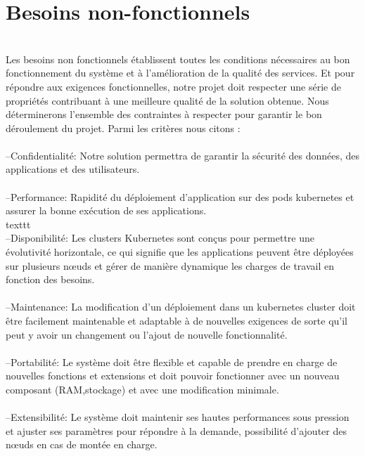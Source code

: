 \section{\LARGE Besoins non-fonctionnels}
\texttt{}\\[0.1cm]
 Les besoins non fonctionnels établissent toutes les conditions nécessaires au bon fonctionnement du système et à l'amélioration de la qualité des services. Et pour répondre aux exigences fonctionnelles, notre projet doit respecter une série de propriétés contribuant à une meilleure qualité de la solution obtenue.
Nous déterminerons l'ensemble des contraintes à respecter pour garantir le bon déroulement du projet. Parmi les critères nous citons :\\\texttt{}\\[0.01cm]
--Confidentialité: Notre solution permettra de garantir la sécurité des données, des applications et des utilisateurs.\\\texttt{}\\[0.01cm]
--Performance: Rapidité du déploiement d'application sur des pods kubernetes et assurer la bonne exécution de ses applications.\\texttt{}\\[0.01cm]
--Disponibilité: Les clusters Kubernetes sont conçus pour permettre une évolutivité horizontale, ce qui signifie que les applications peuvent être déployées sur plusieurs nœuds et gérer de manière dynamique les charges de travail en fonction des besoins.\\\texttt{}\\[0.01cm]
--Maintenance: La modification d'un déploiement dans un kubernetes cluster doit être facilement maintenable et adaptable à de nouvelles exigences de sorte qu'il peut y avoir un changement ou l'ajout de nouvelle fonctionnalité.\\\texttt{}\\[0.01cm]
--Portabilité: Le système doit être flexible et capable de prendre en charge de nouvelles fonctions et extensions et doit pouvoir fonctionner avec un nouveau composant (RAM,stockage) et avec une modification minimale.\\\texttt{}\\[0.01cm]
--Extensibilité: Le système doit maintenir ses hautes performances sous pression et ajuster ses paramètres pour répondre à la demande, possibilité d’ajouter des nœuds en cas de montée en charge. \\\texttt{}\\[0.01cm]

